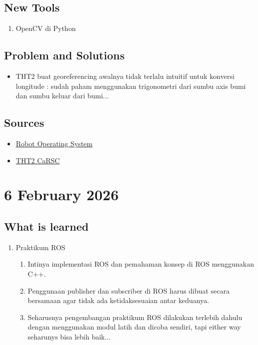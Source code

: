 \documentclass{article}
\begin{document}
\subsection{New Tools}
\begin{enumerate}
    \item OpenCV di Python
\end{enumerate}

\subsection{Problem and Solutions}
\begin{itemize}
    \item THT2 buat georeferencing awalnya tidak terlalu intuitif untuk konversi longitude : sudah paham menggunakan trigonometri dari sumbu axis bumi dan sumbu keluar dari bumi...
\end{itemize}

\subsection{Sources}
\begin{itemize}
    \item \href{https://docs.google.com/presentation/d/18DQUMYNN4oPj1lSmnkNGh7D40_offYggbeVAfXhlf1g/edit?slide=id.g3bc4d0c4fba_0_3#slide=id.g3bc4d0c4fba_0_3}{Robot Operating System}
    \item \href{https://github.com/Pendidikan-RSC-Aksantara-ITB/tht2-BrianHadianSTEI23}{THT2 CaRSC}
\end{itemize}

\section{6 February 2026}

\subsection{What is learned}
\begin{enumerate}
    \item Praktikum ROS
    \begin{enumerate}
        \item Intinya implementasi ROS dan pemahaman konsep di ROS menggunakan C++.
        \item Penggunaan publisher dan subscriber di ROS harus dibuat secara bersamaan agar tidak ada ketidaksesuaian antar keduanya.
        \item Seharusnya pengembangan praktikum ROS dilakukan terlebih dahulu dengan menggunakan modul latih dan dicoba sendiri, tapi either way seharunys bisa lebih baik...
    \end{enumerate}
\end{enumerate}
\end{document}
